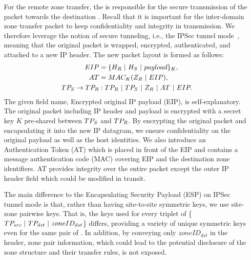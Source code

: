 For the remote zone transfer, the \tp is responsible for the secure transmission of the
packet towards the destination \tp. Recall that it is important for the inter-domain 
zone transfer packet to keep confidentiality and integrity in transmission. We therefore 
leverage the notion of secure tunneling, i.e., the IPSec tunnel mode~\cite{rfc4301,rfc4303}, 
meaning that the original packet is wrapped, encrypted, authenticated, and attached to a 
new IP header. The new packet layout is formed as follows:
\noindent 
\begin{subequations}
	\begin{align}
		EIP                     & = \{H_R~|~H_S~|~payload\}_K,      \\
		AT                      & = MAC_K(Z_R~|~EIP),               \\
		TP_S \rightarrow TP_R & : TP_R~|~TP_S~|~Z_R~|~AT~|~EIP. 
	\end{align}%
	\label{eq:forwarding}%
\end{subequations}%
The given field name, Encrypted original IP payload (EIP), is self-explanatory. 
The original 
packet including IP header and payload is encrypted with a secret key $K$ pre-shared 
between $TP_S$ and $TP_R$. By encrypting the original packet and encapsulating it into
the new IP datagram, we ensure confidentiality on the original payload as well as the 
host identities. We also introduce an Authentication Token (AT) which is placed in front of 
the EIP and contains a message authentication code (MAC) covering EIP and the destination 
zone identifiers.
AT provides integrity over the entire packet except the outer IP header field which could 
be modified in transit.


The main difference to the Encapsulating Security Payload (ESP) on IPSec tunnel mode 
is that, rather than having site-to-site symmetric keys, we use site-zone pairwise keys.
That is, the keys used for every triplet of \{$TP_{src}~|~TP_{dst}~|~zoneID_{dst}$\} 
differs, providing a variety of unique symmetric keys even for the same pair of \tps. 
In addition, by conveying only $zoneID_{dst}$ in the header, zone pair information, which 
could lead to the potential disclosure of the zone structure
and their transfer rules, is not exposed. 


